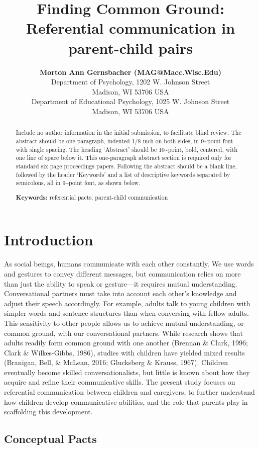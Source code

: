 \documentclass[10pt, letterpaper]{article}
\title{Finding Common Ground: Referential communication in parent-child pairs}
\author{{\large \bf Morton Ann Gernsbacher (MAG@Macc.Wisc.Edu)} \\ Department of Psychology, 1202 W. Johnson Street \\ Madison, WI 53706 USA \AND {\large \bf Sharon J.~Derry (SDJ@Macc.Wisc.Edu)} \\ Department of Educational Psychology, 1025 W. Johnson Street \\ Madison, WI 53706 USA}
\begin{document}
\maketitle

\begin{abstract}
Include no author information in the initial submission, to facilitate
blind review. The abstract should be one paragraph, indented 1/8 inch on
both sides, in 9\textasciitilde{}point font with single spacing. The
heading `Abstract' should be 10\textasciitilde{}point, bold, centered,
with one line of space below it. This one-paragraph abstract section is
required only for standard six page proceedings papers. Following the
abstract should be a blank line, followed by the header `Keywords' and a
list of descriptive keywords separated by semicolons, all in
9\textasciitilde{}point font, as shown below.

\textbf{Keywords:}
referential pacts; parent-child communication
\end{abstract}

\hypertarget{introduction}{%
\section{Introduction}\label{introduction}}

As social beings, humans communicate with each other constantly. We use
words and gestures to convey different messages, but communication
relies on more than just the ability to speak or gesture---it requires
mutual understanding. Conversational partners must take into account
each other's knowledge and adjust their speech accordingly. For example,
adults talk to young children with simpler words and sentence structures
than when conversing with fellow adults. This sensitivity to other
people allows us to achieve mutual understanding, or common ground, with
our conversational partners. While research shows that adults readily
form common ground with one another (Brennan \& Clark, 1996; Clark \&
Wilkes-Gibbs, 1986), studies with children have yielded mixed results
(Branigan, Bell, \& McLean, 2016; Glucksberg \& Krauss, 1967). Children
eventually become skilled conversationalists, but little is known about
how they acquire and refine their communicative skills. The present
study focuses on referential communication between children and
caregivers, to further understand how children develop communicative
abilities, and the role that parents play in scaffolding this
development.

\hypertarget{conceptual-pacts}{%
\subsection{Conceptual Pacts}\label{conceptual-pacts}}
\end{document}
